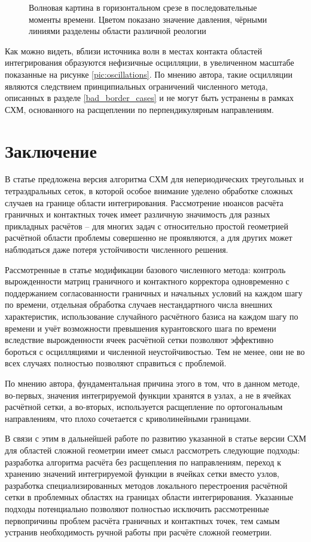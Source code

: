 \documentclass[a4paper]{article}
\numberwithin{equation}{section}
\begin{document}
\begin{figure}[h]
\begin{subfigure}{.18\textwidth}
\end{subfigure}
\caption{Волновая картина в горизонтальном срезе в последовательные моменты времени. 
Цветом показано значение давления, чёрными линиями разделены области различной реологии}
\label{fig:waves-z}
\end{figure}

Как можно видеть, вблизи источника волн в местах контакта областей интегрирования 
образуются нефизичные осцилляции, в увеличенном масштабе показанные на рисунке 
\ref{pic:oscillations}. По мнению автора, 
такие осцилляции являются следствием принципиальных 
ограничений численного метода, описанных в разделе \ref{bad_border_cases} и 
не могут быть устранены в рамках СХМ, основанного на расщеплении по перпендикулярным направлениям. 


\section{Заключение}
В статье предложена версия алгоритма СХМ для непериодических 
треугольных и тетраэдральных сеток, в которой особое внимание уделено 
обработке сложных случаев на границе области интегрирования. 
Рассмотрение нюансов расчёта граничных и контактных точек 
имеет различную значимость для разных прикладных расчётов -- 
для многих задач с относительно простой геометрией расчётной области 
проблемы совершенно не проявляются, 
а для других может наблюдаться даже потеря устойчивости численного решения. 

Рассмотренные в статье модификации базового численного метода: 
контроль вырожденности матриц граничного и контактного корректора 
одновременно с поддержанием согласованности граничных и начальных условий 
на каждом шагу по времени, 
отдельная обработка случаев нестандартного числа внешних характеристик, 
использование случайного расчётного базиса на каждом шагу по времени и 
учёт возможности превышения курантовского шага по времени 
вследствие вырожденности ячеек расчётной сетки 
позволяют эффективно бороться с осцилляциями и численной неустойчивостью. 
Тем не менее, они не во всех случаях полностью позволяют справиться с проблемой. 

По мнению автора, фундаментальная причина этого в том, что в данном методе, 
во-первых, значения интегрируемой функции хранятся в узлах, 
а не в ячейках расчётной сетки, 
а во-вторых, используется расщепление по ортогональным направлениям, что 
плохо сочетается с криволинейными границами. 

В связи с этим в дальнейшей работе по развитию 
указанной в статье версии СХМ 
для областей сложной геометрии имеет смысл рассмотреть следующие подходы: 
разработка алгоритма расчёта без расщепления по направлениям, 
переход к хранению значений интегрируемой функции в ячейках сетки вместо узлов, 
разработка специализированных методов локального перестроения 
расчётной сетки в проблемных областях на границах области интегрирования. 
Указанные подходы потенциально позволяют полностью исключить 
рассмотренные первопричины проблем расчёта граничных и контактных точек, 
тем самым устранив необходимость ручной работы при расчёте сложной геометрии.
\end{document}
